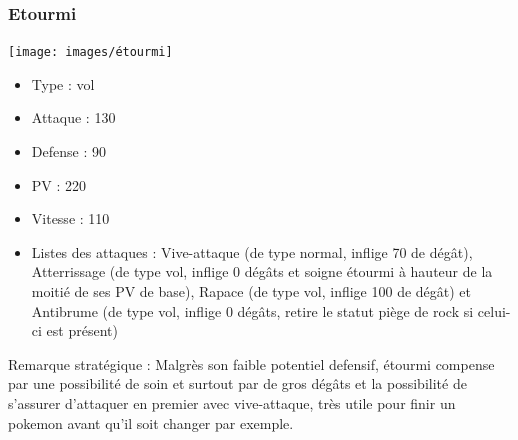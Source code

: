 		\subsubsection{Etourmi}
            \begin{center}
				\texttt{[image: images/étourmi]}
			\end{center}
			\begin{itemize}
				\item Type : vol
				\item Attaque : 130
				\item Defense : 90
				\item PV : 220
				\item Vitesse : 110
				\item Listes des attaques : Vive-attaque (de type normal, inflige 70 de dégât), Atterrissage (de type vol, inflige 0 dégâts et soigne étourmi à hauteur de la moitié de ses PV de base), Rapace (de type vol, inflige 100 de dégât) et Antibrume (de type vol, inflige 0 dégâts, retire le statut piège de rock si celui-ci est présent)
			\end{itemize}
			Remarque stratégique : Malgrès son faible potentiel defensif, étourmi compense par une possibilité de soin et surtout par de gros dégâts et la possibilité de s'assurer d'attaquer en premier avec vive-attaque, très utile pour finir un pokemon avant qu'il soit changer par exemple.
